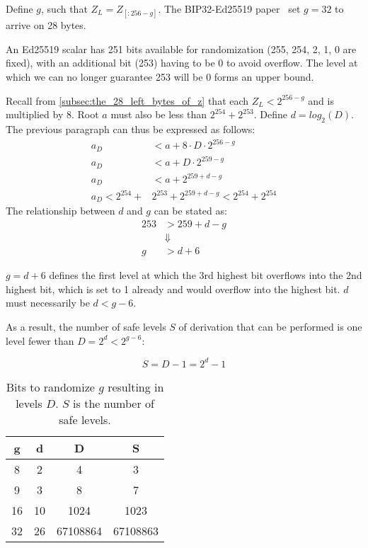 \documentclass[12pt, a4paper, twocolumn]{article}
\begin{document}
Define $g$, such that $Z_L = Z_{[:256-g]}$. The BIP32-Ed25519 paper~\cite{BIP32-Ed25519} set $g=32$ to arrive on 28 bytes.

An Ed25519 scalar has 251 bits available for randomization (255, 254, 2, 1, 0 are fixed), with an additional bit (253) having to be 0 to avoid overflow. The level at which we can no longer guarantee 253 will be 0 forms an upper bound.

Recall from \cref{subsec:the_28_left_bytes_of_z} that each $Z_L < 2^{256 - g}$ and is multiplied by 8. Root $a$ must also be less than $2^{254} + 2^{253}$. Define $d = log_2(D)$. The previous paragraph can thus be expressed as follows:
\begin{align*}
  a_D &< a + 8\cdot D\cdot2^{256 - g} \\
  a_D &< a + D\cdot2^{259 - g} \\
  a_D &< a + 2^{259 + d - g}\\
  a_D < 2^{254} +& 2^{253} + 2^{259 + d - g} < 2^{254} + 2^{254}
\end{align*}
The relationship between $d$ and $g$ can be stated as:
\begin{align*}
  253 &> 259 + d - g \\
  &\Downarrow \\
  g &> d + 6
\end{align*}

 $g = d + 6$ defines the first level at which the 3rd highest bit overflows into the 2nd highest bit, which is set to 1 already and would overflow into the highest bit. $d$ must necessarily be $d < g - 6$.

 As a result, the number of safe levels $S$ of derivation that can be performed is one level fewer than $D = 2^{d} < 2^{g - 6}$:

 \begin{equation*}
  S = D - 1 = 2^{d} - 1
  \end{equation*}

\begin{table}[h]
  \centering
  \begin{tabular}{|c|c|c|c|}
  \hline
  g & d  & D & S  \\
  \hline
  8 & 2 & 4 & 3 \\
  9 & 3 & 8 & 7 \\
  16 & 10 & 1024 & 1023 \\
  32 & 26 & 67108864 & 67108863  \\
  \hline
  \end{tabular}
  \caption{Bits to randomize $g$ resulting in levels $D$. $S$ is the number of safe levels.}
  \label{tab:g_and_d}
\end{table}
\end{document}

